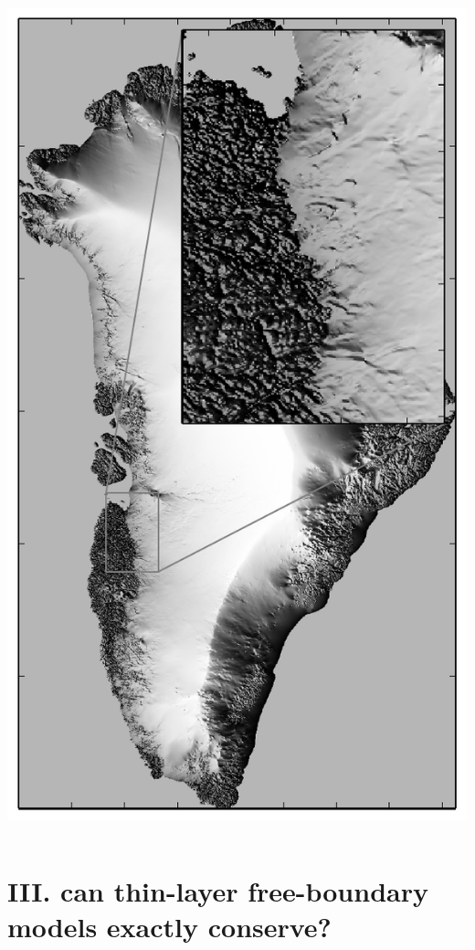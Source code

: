 \documentclass[hide notes,intlimits]{beamer}
\begin{document}
\begin{frame}
\begin{columns}
\begin{column}{0.4\textwidth}
\includegraphics[height=0.9\textheight]{grnwinset}
\end{column}
\end{columns}
\end{frame}


\section[conservation w free boundaries?]{III. can thin-layer free-boundary models exactly conserve?}
\end{document}
